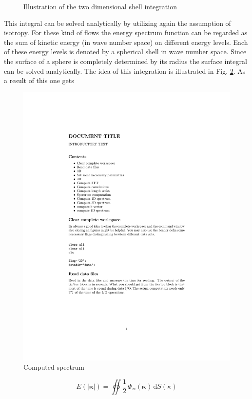 \documentclass[preprint,12pt,ntfdMod]{elsarticle}
\begin{document}
\begin{par}
\begin{figure}[t!]
      \label{fig:shell_int}
      \caption{Illustration of the two dimensional shell integration}
  \end{figure}
This integral can be solved analytically by utilizing again the assumption of isotropy.
For these kind of flows the energy spectrum function can be regarded as the sum of kinetic energy
(in wave number space) on different energy levels. Each of these energy levels is denoted by a spherical
shell in wave number space. Since the surface of a sphere is completely determined by its radius the
surface integral can be solved analytically. The idea of this integration is illustrated
in Fig. \ref{fig:shell_int}.
As a result of this one gets
\begin{figure}[t!]
      \includegraphics[scale=0.7]{spectrum}
      \caption{Computed spectrum}
      \label{fig:shell_int}
\end{figure}
  \begin{equation}
      E(|\boldsymbol\kappa|)=\oiint\frac{1}{2}\,\Phi_{ii}(\boldsymbol\kappa)\,\mathrm{d}S(\kappa)

\end{equation}
\end{par}
\end{document}
